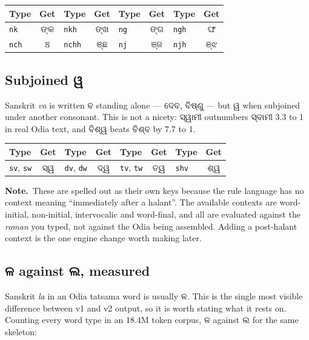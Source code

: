 \documentclass[11pt, a4paper]{article}
\newcommand{\od}[1]{{\odiafont #1}}          %
\newcommand{\odb}[1]{{\odiafont\large #1}}   %
\newcommand{\knote}{{\color{headerblue}\textbf{\textsf{Note.}}}\ }
\begin{document}
\begin{center}
\begin{tabular}{l c l c l c l c}
\toprule
Type & Get & Type & Get & Type & Get & Type & Get \\
\midrule
\texttt{nk}  & \odb{ଙ୍କ} & \texttt{nkh}  & \odb{ଙ୍ଖ} & \texttt{ng} & \odb{ଙ୍ଗ} & \texttt{ngh} & \odb{ଙ୍ଘ} \\
\texttt{nch} & \odb{ଞ୍ଚ} & \texttt{nchh} & \odb{ଞ୍ଛ} & \texttt{nj} & \odb{ଞ୍ଜ} & \texttt{njh} & \odb{ଞ୍ଝ} \\
\bottomrule
\end{tabular}
\end{center}

\subsection*{Subjoined \od{ୱ}}

Sanskrit \emph{va} is written \od{ବ} standing alone --- \od{ଦେବ}, \od{ବିଷ୍ଣୁ} --- but
\od{ୱ} when subjoined under another consonant. This is not a nicety: \od{ସ୍ୱାମୀ}
outnumbers \od{ସ୍ବାମୀ} 3.3 to 1 in real Odia text, and \od{ବିଶ୍ୱ} beats \od{ବିଶ୍ବ} by 7.7
to 1.

\begin{center}
\begin{tabular}{l c l c l c l c}
\toprule
Type & Get & Type & Get & Type & Get & Type & Get \\
\midrule
\texttt{sv}, \texttt{sw} & \odb{ସ୍ୱ} & \texttt{dv}, \texttt{dw} & \odb{ଦ୍ୱ} &
\texttt{tv}, \texttt{tw} & \odb{ତ୍ୱ} & \texttt{shv} & \odb{ଶ୍ୱ} \\
\bottomrule
\end{tabular}
\end{center}

\begin{notebox}
\knote These are spelled out as their own keys because the rule language has no context
meaning ``immediately after a halant''. The available contexts are word-initial,
non-initial, intervocalic and word-final, and all are evaluated against the \emph{roman}
you typed, not against the Odia being assembled. Adding a post-halant context is the one
engine change worth making later.
\end{notebox}

\subsection*{\od{ଳ} against \od{ଲ}, measured}

Sanskrit \emph{la} in an Odia tatsama word is usually \od{ଳ}. This is the single most
visible difference between v1 and v2 output, so it is worth stating what it rests on.
Counting every word type in an 18.4M token corpus, \od{ଳ} against \od{ଲ} for the same
skeleton:
\end{document}
